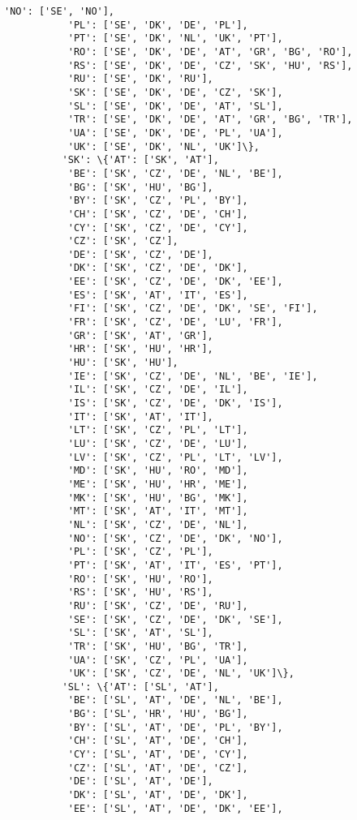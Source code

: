 \documentclass[11pt]{article}
\begin{document}
\begin{Verbatim}[commandchars=\\\{\}]
           'NO': ['SE', 'NO'],
           'PL': ['SE', 'DK', 'DE', 'PL'],
           'PT': ['SE', 'DK', 'NL', 'UK', 'PT'],
           'RO': ['SE', 'DK', 'DE', 'AT', 'GR', 'BG', 'RO'],
           'RS': ['SE', 'DK', 'DE', 'CZ', 'SK', 'HU', 'RS'],
           'RU': ['SE', 'DK', 'RU'],
           'SK': ['SE', 'DK', 'DE', 'CZ', 'SK'],
           'SL': ['SE', 'DK', 'DE', 'AT', 'SL'],
           'TR': ['SE', 'DK', 'DE', 'AT', 'GR', 'BG', 'TR'],
           'UA': ['SE', 'DK', 'DE', 'PL', 'UA'],
           'UK': ['SE', 'DK', 'NL', 'UK']\},
          'SK': \{'AT': ['SK', 'AT'],
           'BE': ['SK', 'CZ', 'DE', 'NL', 'BE'],
           'BG': ['SK', 'HU', 'BG'],
           'BY': ['SK', 'CZ', 'PL', 'BY'],
           'CH': ['SK', 'CZ', 'DE', 'CH'],
           'CY': ['SK', 'CZ', 'DE', 'CY'],
           'CZ': ['SK', 'CZ'],
           'DE': ['SK', 'CZ', 'DE'],
           'DK': ['SK', 'CZ', 'DE', 'DK'],
           'EE': ['SK', 'CZ', 'DE', 'DK', 'EE'],
           'ES': ['SK', 'AT', 'IT', 'ES'],
           'FI': ['SK', 'CZ', 'DE', 'DK', 'SE', 'FI'],
           'FR': ['SK', 'CZ', 'DE', 'LU', 'FR'],
           'GR': ['SK', 'AT', 'GR'],
           'HR': ['SK', 'HU', 'HR'],
           'HU': ['SK', 'HU'],
           'IE': ['SK', 'CZ', 'DE', 'NL', 'BE', 'IE'],
           'IL': ['SK', 'CZ', 'DE', 'IL'],
           'IS': ['SK', 'CZ', 'DE', 'DK', 'IS'],
           'IT': ['SK', 'AT', 'IT'],
           'LT': ['SK', 'CZ', 'PL', 'LT'],
           'LU': ['SK', 'CZ', 'DE', 'LU'],
           'LV': ['SK', 'CZ', 'PL', 'LT', 'LV'],
           'MD': ['SK', 'HU', 'RO', 'MD'],
           'ME': ['SK', 'HU', 'HR', 'ME'],
           'MK': ['SK', 'HU', 'BG', 'MK'],
           'MT': ['SK', 'AT', 'IT', 'MT'],
           'NL': ['SK', 'CZ', 'DE', 'NL'],
           'NO': ['SK', 'CZ', 'DE', 'DK', 'NO'],
           'PL': ['SK', 'CZ', 'PL'],
           'PT': ['SK', 'AT', 'IT', 'ES', 'PT'],
           'RO': ['SK', 'HU', 'RO'],
           'RS': ['SK', 'HU', 'RS'],
           'RU': ['SK', 'CZ', 'DE', 'RU'],
           'SE': ['SK', 'CZ', 'DE', 'DK', 'SE'],
           'SL': ['SK', 'AT', 'SL'],
           'TR': ['SK', 'HU', 'BG', 'TR'],
           'UA': ['SK', 'CZ', 'PL', 'UA'],
           'UK': ['SK', 'CZ', 'DE', 'NL', 'UK']\},
          'SL': \{'AT': ['SL', 'AT'],
           'BE': ['SL', 'AT', 'DE', 'NL', 'BE'],
           'BG': ['SL', 'HR', 'HU', 'BG'],
           'BY': ['SL', 'AT', 'DE', 'PL', 'BY'],
           'CH': ['SL', 'AT', 'DE', 'CH'],
           'CY': ['SL', 'AT', 'DE', 'CY'],
           'CZ': ['SL', 'AT', 'DE', 'CZ'],
           'DE': ['SL', 'AT', 'DE'],
           'DK': ['SL', 'AT', 'DE', 'DK'],
           'EE': ['SL', 'AT', 'DE', 'DK', 'EE'],

\end{Verbatim}
\end{document}
